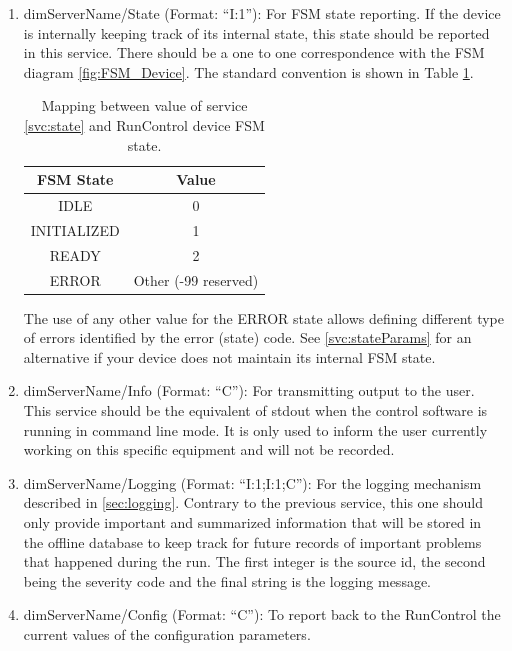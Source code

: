 \documentclass[a4paper]{article}
\begin{document}
\begin{enumerate}[label=\textbf{SVC.\arabic*}]
	\item \label{svc:state} dimServerName/State (Format: ``I:1''): For FSM state
	reporting. If the device is internally keeping track of its internal state,
	this state should be reported in this service. There should be a one to one
	correspondence with the FSM diagram \ref{fig:FSM_Device}. The standard
	convention is shown in Table \ref{table:FSMStates}.
	\begin{table}
		\center
		\begin{tabular}{c|c}
			FSM State & Value\\
			\hline
			IDLE & 0\\
			INITIALIZED & 1\\
			READY & 2\\
			ERROR & Other (-99 reserved)\\
			\hline
		\end{tabular}
		\caption{Mapping between value of service \ref{svc:state} and RunControl
		device FSM state.}
		\label{table:FSMStates}
	\end{table}
	The use of any other value for the ERROR state allows defining different type
	of errors identified by the error (state) code. See \ref{svc:stateParams} for
	an alternative if your device does not maintain its internal FSM state.
	\item \label{svc:info} dimServerName/Info (Format: ``C''): For transmitting
	output to the user. This service should be the equivalent of stdout when the
	control software is running in command line mode. It is only used to inform
	the user currently working on this specific equipment and will not be
	recorded.
	\item \label{svc:logging} dimServerName/Logging (Format: ``I:1;I:1;C''): For
	the logging mechanism described in \ref{sec:logging}. Contrary to the previous
	service, this one should only provide important and summarized information
	that will be stored in the offline database to keep track for future records
	of important problems that happened during the run. The first integer is the
	source id, the second being the severity code and the final string is the
	logging message.
	\item \label{svc:config} dimServerName/Config (Format: ``C''): To report back
	to the RunControl the current values of the configuration parameters.
\end{enumerate}
\end{document}
